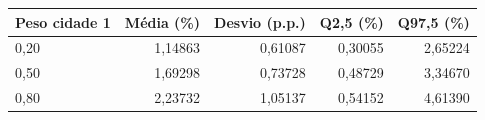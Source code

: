 \begin{tabular}{lrrrr}
\toprule
Peso cidade 1 & Média (\%) & Desvio (p.p.) & Q2,5 (\%) & Q97,5 (\%) \\
\midrule
0,20 & 1,14863 & 0,61087 & 0,30055 & 2,65224 \\
0,50 & 1,69298 & 0,73728 & 0,48729 & 3,34670 \\
0,80 & 2,23732 & 1,05137 & 0,54152 & 4,61390 \\
\bottomrule
\end{tabular}
